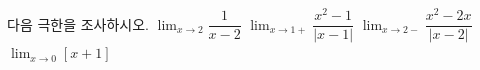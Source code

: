 다음 극한을 조사하시오. 
 $\displaystyle\lim_{x\to 2}\dfrac{1}{x-2}$
 $\displaystyle\lim_{x\to 1+}\dfrac{x^2-1}{|x-1|}$
 $\displaystyle\lim_{x\to 2-}\dfrac{x^2-2x}{|x-2|}$
 $\displaystyle\lim_{x\to 0}[x+1]$

